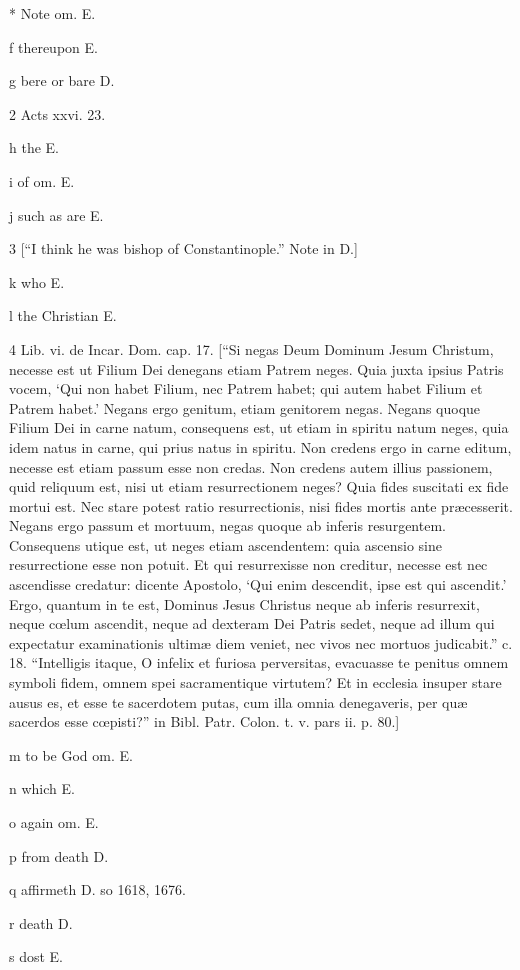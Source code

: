 *
Note om. E.

f
thereupon E.

g
bere or bare D.

2
Acts xxvi. 23.

h
the E.

i
of om. E.

j
such as are E.

3
[“I think he was bishop of Constantinople.” Note in D.]

k
who E.

l
the Christian E.

4
Lib. vi. de Incar. Dom. cap. 17. [“Si negas Deum Dominum Jesum Christum, necesse est ut Filium Dei denegans etiam Patrem neges. Quia juxta ipsius Patris vocem, ‘Qui non habet Filium, nec Patrem habet; qui autem habet Filium et Patrem habet.’ Negans ergo genitum, etiam genitorem negas. Negans quoque Filium Dei in carne natum, consequens est, ut etiam in spiritu natum neges, quia idem natus in carne, qui prius natus in spiritu. Non credens ergo in carne editum, necesse est etiam passum esse non credas. Non credens autem illius passionem, quid reliquum est, nisi ut etiam resurrectionem neges? Quia fides suscitati ex fide mortui est. Nec stare potest ratio resurrectionis, nisi fides mortis ante præcesserit. Negans ergo passum et mortuum, negas quoque ab inferis resurgentem. Consequens utique est, ut neges etiam ascendentem: quia ascensio sine resurrectione esse non potuit. Et qui resurrexisse non creditur, necesse est nec ascendisse credatur: dicente Apostolo, ‘Qui enim descendit, ipse est qui ascendit.’ Ergo, quantum in te est, Dominus Jesus Christus neque ab inferis resurrexit, neque cœlum ascendit, neque ad dexteram Dei Patris sedet, neque ad illum qui expectatur examinationis ultimæ diem veniet, nec vivos nec mortuos judicabit.” c. 18. “Intelligis itaque, O infelix et furiosa perversitas, evacuasse te penitus omnem symboli fidem, omnem spei sacramentique virtutem? Et in ecclesia insuper stare ausus es, et esse te sacerdotem putas, cum illa omnia denegaveris, per quæ sacerdos esse cœpisti?” in Bibl. Patr. Colon. t. v. pars ii. p. 80.]

m
to be God om. E.

n
which E.

o
again om. E.

p
from death D.

q
affirmeth D. so 1618, 1676.

r
death D.

s
dost E.

